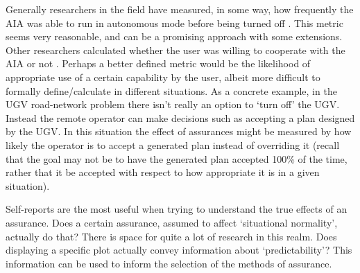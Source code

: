     Generally researchers in the field have measured, in some way, how frequently the AIA was able to run in autonomous mode before being turned off \cite{Freedy2007-sg,Desai2012-rc}. This metric seems very reasonable, and can be a promising approach with some extensions. Other researchers calculated whether the user was willing to cooperate with the AIA or not \cite{Salem2015-md,Wu2016-ei,Bainbridge2011-pl}. Perhaps a better defined metric would be the likelihood of appropriate use of a certain capability by the user, albeit more difficult to formally define/calculate in different situations. As a concrete example, in the UGV road-network problem there isn't really an option to `turn off' the UGV. Instead the remote operator can make decisions such as accepting a plan designed by the UGV. In this situation the effect of assurances might be measured by how likely the operator is to accept a generated plan instead of overriding it (recall that the goal may not be to have the generated plan accepted 100\% of the time, rather that it be accepted with respect to how appropriate it is in a given situation).

    Self-reports are the most useful when trying to understand the true effects of an assurance. Does a certain assurance, assumed to affect `situational normality', actually do that? There is space for quite a lot of research in this realm. Does displaying a specific plot actually convey  information about `predictability'? This information can be used to inform the selection of the methods of assurance.

